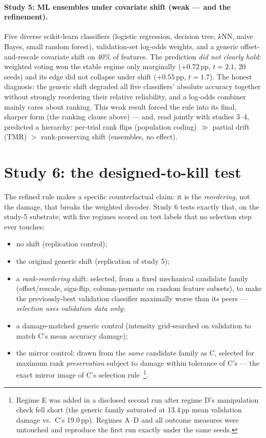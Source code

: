 \documentclass[aps,prapplied,preprint,amsmath,amssymb,floatfix]{revtex4-2}
\begin{document}
\paragraph{Study 5: ML ensembles under covariate shift (weak --- and the
refinement).} Five diverse scikit-learn classifiers (logistic regression,
decision tree, $k$NN, naive Bayes, small random forest), validation-set
log-odds weights, and a generic offset-and-rescale covariate shift on
40\% of features. The prediction \emph{did not clearly hold}: weighted
voting won the stable regime only marginally ($+0.72$\,pp, $t=2.1$, 20
seeds) and its edge did not collapse under shift ($+0.55$\,pp, $t=1.7$).
The honest diagnosis: the generic shift degraded all five classifiers'
absolute accuracy together without strongly reordering their relative
reliability, and a log-odds combiner mainly cares about ranking. This
weak result forced the rule into its final, sharper form (the ranking
clause above) --- and, read jointly with studies 3--4, predicted a
hierarchy: per-trial rank flips (population coding) $\gg$ partial drift
(TMR) $>$ rank-preserving shift (ensembles, no effect).

\section{Study 6: the designed-to-kill test}

The refined rule makes a specific counterfactual claim: it is the
\emph{reordering}, not the damage, that breaks the weighted decoder. Study
6 tests exactly that, on the study-5 substrate, with five regimes scored
on test labels that no selection step ever touches:

\begin{itemize}
\item[A.] no shift (replication control);
\item[B.] the original generic shift (replication of study 5);
\item[C.] a \emph{rank-reordering} shift: selected, from a fixed
mechanical candidate family (offset/rescale, sign-flip, column-permute on
random feature subsets), to make the previously-best validation
classifier maximally worse than its peers --- \emph{selection uses
validation data only};
\item[D.] a damage-matched generic control (intensity grid-searched on
validation to match C's mean accuracy damage);
\item[E.] the mirror control: drawn from the \emph{same} candidate family
as C, selected for maximum rank \emph{preservation} subject to damage
within tolerance of C's --- the exact mirror image of C's selection
rule~\footnote{Regime E was added in a disclosed second run after regime
D's manipulation check fell short (the generic family saturated at
13.4\,pp mean validation damage vs.\ C's 19.0\,pp). Regimes A--D and all
outcome measures were untouched and reproduce the first run exactly under
the same seeds.}.
\end{itemize}
\end{document}
